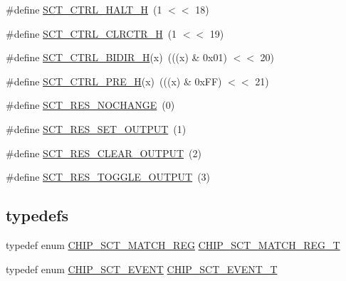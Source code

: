 \begin{DoxyCompactItemize}
\item 
\#define \hyperlink{group___s_c_t__18_x_x__43_x_x_ga19527730d0cdbf041987ab3510a0ee16}{S\+C\+T\+\_\+\+C\+T\+R\+L\+\_\+\+H\+A\+L\+T\+\_\+H}~(1 $<$$<$ 18)
\item 
\#define \hyperlink{group___s_c_t__18_x_x__43_x_x_ga792f39bf995d1a7397bb4600e44dc7f7}{S\+C\+T\+\_\+\+C\+T\+R\+L\+\_\+\+C\+L\+R\+C\+T\+R\+\_\+H}~(1 $<$$<$ 19)
\item 
\#define \hyperlink{group___s_c_t__18_x_x__43_x_x_ga9d96e3f51e16487c6f8c652cbbdc050b}{S\+C\+T\+\_\+\+C\+T\+R\+L\+\_\+\+B\+I\+D\+I\+R\+\_\+H}(x)~(((x) \& 0x01) $<$$<$ 20)
\item 
\#define \hyperlink{group___s_c_t__18_x_x__43_x_x_ga399f28b3b6a93cb14b19db3df66a565d}{S\+C\+T\+\_\+\+C\+T\+R\+L\+\_\+\+P\+R\+E\+\_\+H}(x)~(((x) \& 0x\+F\+F) $<$$<$ 21)
\item 
\#define \hyperlink{group___s_c_t__18_x_x__43_x_x_ga9f704972cc5fefff30694a1c103ee272}{S\+C\+T\+\_\+\+R\+E\+S\+\_\+\+N\+O\+C\+H\+A\+N\+GE}~(0)
\item 
\#define \hyperlink{group___s_c_t__18_x_x__43_x_x_gaf5512f6f59ea7b5b7af86a50a85408dc}{S\+C\+T\+\_\+\+R\+E\+S\+\_\+\+S\+E\+T\+\_\+\+O\+U\+T\+P\+UT}~(1)
\item 
\#define \hyperlink{group___s_c_t__18_x_x__43_x_x_gaaa994f1d7b3ec39640563bf1f3a5e2ac}{S\+C\+T\+\_\+\+R\+E\+S\+\_\+\+C\+L\+E\+A\+R\+\_\+\+O\+U\+T\+P\+UT}~(2)
\item 
\#define \hyperlink{group___s_c_t__18_x_x__43_x_x_gab7f416d617a424072cc0f29413f8e419}{S\+C\+T\+\_\+\+R\+E\+S\+\_\+\+T\+O\+G\+G\+L\+E\+\_\+\+O\+U\+T\+P\+UT}~(3)
\end{DoxyCompactItemize}
\subsection*{\textquotesingle{}typedefs\textquotesingle{}}
\begin{DoxyCompactItemize}
\item 
typedef enum \hyperlink{group___s_c_t__18_x_x__43_x_x_ga642884ed46b523a1106a6505950e0259}{C\+H\+I\+P\+\_\+\+S\+C\+T\+\_\+\+M\+A\+T\+C\+H\+\_\+\+R\+EG} \hyperlink{group___s_c_t__18_x_x__43_x_x_gab0308855f6bb30035f3165d01df90e27}{C\+H\+I\+P\+\_\+\+S\+C\+T\+\_\+\+M\+A\+T\+C\+H\+\_\+\+R\+E\+G\+\_\+T}
\item 
typedef enum \hyperlink{group___s_c_t__18_x_x__43_x_x_gae9508d79393246da4eda561eff0ec9e3}{C\+H\+I\+P\+\_\+\+S\+C\+T\+\_\+\+E\+V\+E\+NT} \hyperlink{group___s_c_t__18_x_x__43_x_x_ga9c76365e19f53e676f05cb7ccec143f7}{C\+H\+I\+P\+\_\+\+S\+C\+T\+\_\+\+E\+V\+E\+N\+T\+\_\+T}
\end{DoxyCompactItemize}
